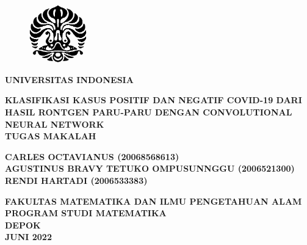 %

%
%

\begin{titlepage}
    \begin{center}    
        \begin{figure}
            \begin{center}
                \includegraphics[width=2.5cm]{pics/makara.png}
            \end{center}
        \end{figure}    
        \vspace*{0cm}
        \textbf{
        	UNIVERSITAS INDONESIA\\
        }
        
        \vspace*{1.0cm}
        \textbf{KLASIFIKASI KASUS POSITIF DAN NEGATIF COVID-19 DARI HASIL RONTGEN PARU-PARU DENGAN CONVOLUTIONAL NEURAL NETWORK} \\[1.0cm]

        \vspace*{2.5 cm}    
        \textbf{TUGAS MAKALAH}

        \vspace*{3 cm}       
        \textbf{CARLES OCTAVIANUS (20068568613)}\\
        \textbf{AGUSTINUS BRAVY TETUKO OMPUSUNNGGU (2006521300)} \\
        \textbf{
        RENDI HARTADI (2006533383)}\\

        \vspace*{5.0cm}

        \textbf{
        	FAKULTAS MATEMATIKA DAN ILMU PENGETAHUAN ALAM
        \\	PROGRAM STUDI MATEMATIKA \\
        	DEPOK \\
        	JUNI 2022
        }
    \end{center}
\end{titlepage}
